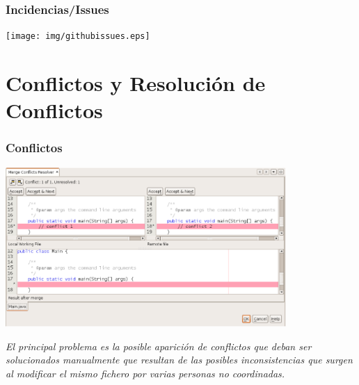 \documentclass{beamer}
\begin{document}
\begin{frame}
\frametitle{Incidencias/Issues}
\begin{center}
\texttt{[image: img/githubissues.eps]}
\end{center}
\end{frame}

\section{Conflictos y Resolución de Conflictos}


\begin{frame}
\frametitle{Conflictos}
\begin{center}
\includegraphics[width=0.8\textwidth]{img/conflict-resolver.eps}
\end{center}

{\it 
El principal problema es la posible
aparición de {\color{blue} conflictos} que deban ser solucionados manualmente 
que resultan de
las posibles inconsistencias que surgen al modificar el mismo fichero
por varias personas no coordinadas. 
}
\end{frame}
\end{document}
